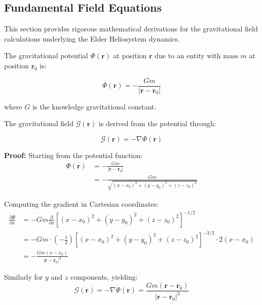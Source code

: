 \subsection{Fundamental Field Equations}

This section provides rigorous mathematical derivations for the gravitational field calculations underlying the Elder Heliosystem dynamics.

\begin{definition}
The gravitational potential $\Phi(\mathbf{r})$ at position $\mathbf{r}$ due to an entity with mass $m$ at position $\mathbf{r}_0$ is:

\begin{equation}
\Phi(\mathbf{r}) = -\frac{G m}{|\mathbf{r} - \mathbf{r}_0|}
\end{equation}

where $G$ is the knowledge gravitational constant.
\end{definition}

\begin{theorem}
The gravitational field $\mathcal{G}(\mathbf{r})$ is derived from the potential through:

\begin{equation}
\mathcal{G}(\mathbf{r}) = -\nabla \Phi(\mathbf{r})
\end{equation}

\textbf{Proof:}
Starting from the potential function:
\begin{align}
\Phi(\mathbf{r}) &= -\frac{G m}{|\mathbf{r} - \mathbf{r}_0|} \\
&= -\frac{G m}{\sqrt{(x-x_0)^2 + (y-y_0)^2 + (z-z_0)^2}}
\end{align}

Computing the gradient in Cartesian coordinates:
\begin{align}
\frac{\partial \Phi}{\partial x} &= -G m \frac{\partial}{\partial x} \left[(x-x_0)^2 + (y-y_0)^2 + (z-z_0)^2\right]^{-1/2} \\
&= -G m \cdot \left(-\frac{1}{2}\right) \left[(x-x_0)^2 + (y-y_0)^2 + (z-z_0)^2\right]^{-3/2} \cdot 2(x-x_0) \\
&= -\frac{G m (x-x_0)}{|\mathbf{r} - \mathbf{r}_0|^3}
\end{align}

Similarly for $y$ and $z$ components, yielding:
\begin{equation}
\mathcal{G}(\mathbf{r}) = -\nabla \Phi(\mathbf{r}) = \frac{G m (\mathbf{r} - \mathbf{r}_0)}{|\mathbf{r} - \mathbf{r}_0|^3}
\end{equation}
\end{theorem}

